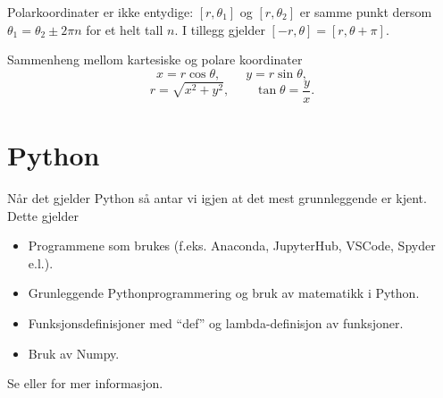 \begin{rem}{}
Polarkoordinater er ikke entydige: $[r,\theta_1]$ og $[r,\theta_2]$ er samme punkt dersom $\theta_1=\theta_2\pm 2\pi n$ for et helt tall $n$. I tillegg gjelder $[-r,\theta]=[r,\theta+\pi]$.
\end{rem}

\begin{defn}{Sammenheng mellom kartesiske og polare koordinater}
\[
x=r\cos\theta, \qquad y=r\sin\theta,
\]
\[
r=\sqrt{x^2+y^2}, \qquad \tan\theta = \frac{y}{x}.
\]
\end{defn}

\section{Python}
Når det gjelder Python så antar vi igjen at det mest grunnleggende er kjent. Dette gjelder 
\begin{itemize}
\item Programmene som brukes (f.eks. Anaconda, JupyterHub, VSCode, Spyder e.l.).
\item Grunleggende Pythonprogrammering og bruk av matematikk i Python.
\item Funksjonsdefinisjoner med ``def'' og lambda-definisjon av funksjoner.
\item Bruk av Numpy.
\end{itemize}
Se \cite[Introduction and Appendix]{Ch23} eller \cite{cfd12} for mer informasjon.

